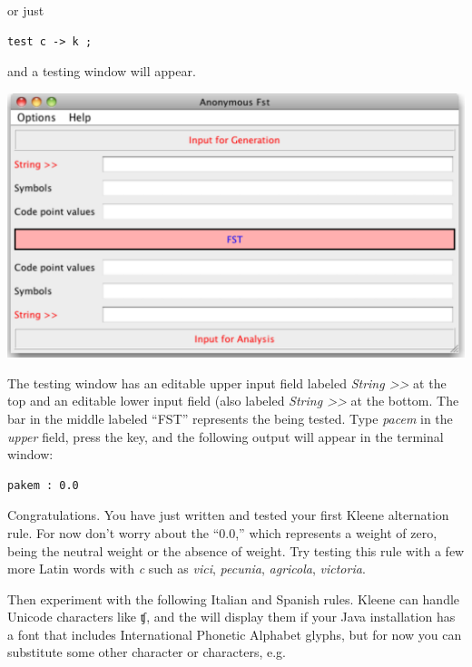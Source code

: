 \noindent
or just


\begin{Verbatim}
test c -> k ;
\end{Verbatim}


\noindent
and a testing window will appear.

\vspace{0.3cm}

\begin{center}
\includegraphics[width=\textwidth]{images/testWindow.pdf}
\end{center}

The testing window has an editable upper input field labeled
\emph{String >>} at the top and an editable lower input field (also
labeled \emph{String >>} at the bottom.  The
bar in the middle labeled ``FST'' represents the  being tested.  Type \emph{pacem} in the \emph{upper} field,
press the  key, and the following output will appear in the  terminal window:


\begin{Verbatim}
pakem : 0.0
\end{Verbatim}

\noindent
Congratulations.  You have just written
and tested your first Kleene alternation rule.  For now don't worry about the ``0.0,'' which
represents a weight of zero, being the neutral weight
or the absence of weight.    Try testing this rule with a few more Latin words with \emph{c} such as
\emph{vici}, \emph{pecunia},
\emph{agricola}, \emph{victoria}.

Then experiment with the following Italian and Spanish rules.  Kleene can handle Unicode characters
like ʧ, and the  will display them if your Java installation has a font
that includes International Phonetic Alphabet glyphs, but for now you can substitute some other character or characters, e.g.



